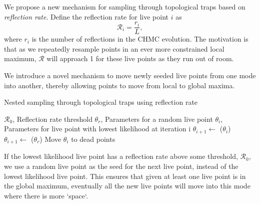 \documentclass[11pt]{article}
\begin{document}
    We propose a new mechanism for sampling through topological traps based on \emph{reflection rate}.
    Define the reflection rate for live point $i$ as
    \begin{equation}\label{eq:reflect_rate}
        \mathcal{R}_i = \frac{r_i}{L},
    \end{equation}
    where $r_i$ is the number of reflections in the CHMC evolution.
    The motivation is that as we repeatedly resample points in an ever more constrained local maximum,
    $\mathcal{R}$ will approach 1 for these live points as they run out of room.

    We introduce a novel mechanism to move newly seeded live points from one mode into
    another, thereby allowing points to move from local to global maxima.

    \begin{algorithm}
        \caption{Nested sampling through topological traps using reflection rate}
        \label{alg:reflection_rate}
        \begin{algorithmic}
            \VARIABLES
            \STATE $\mathcal{R}_0$, Reflection rate threshold
            \STATE $\theta_r$, Parameters for a random live point
            \ENDVARIABLES
            \STATE
            \STATE $\theta_i$, Parameters for live point with lowest likelihood at iteration i
            \STATE $\theta_{i+1} \gets$ ($\theta_i$)
            \ELSE
            \STATE $\theta_{i+1} \gets$ ($\theta_r$)
            \ENDIF
            \STATE Move $\theta_i$ to dead points
        \end{algorithmic}
    \end{algorithm}

    If the lowest likelihood live point has a reflection rate above some threshold, $\mathcal{R}_0$, we use a
    random live point as the seed for the next live point, instead of the lowest likelihood live point.
    This ensures that given at least one live point is in the global maximum, eventually all the new live points will move
    into this mode where there is more `space`.
\end{document}
